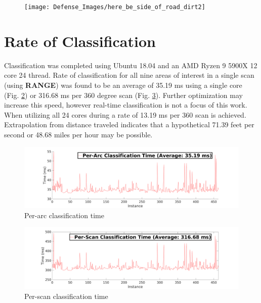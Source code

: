 \documentclass[numbered,pdftex]{ohio-etd}
\begin{document}
{{{		\begin{figure}[H]
			\centering
			\texttt{[image: Defense\_Images/here\_be\_side\_of\_road\_dirt2]}
			\caption[Blackburn Road Side of Road]{}
			\label{fig:here_be_side_of_road_dirt2}
		\end{figure}
		
	}



	\section{Rate of Classification}{
		
		{Classification was completed using Ubuntu 18.04 and an AMD Ryzen 9 5900X 12 core 24 thread. Rate of classification for all nine areas of interest in a single scan (using \textbf{RANGE}) was found to be an average of 35.19 ms using a single core (Fig. \ref{fig:per_arc_classification_time}) or 316.68 ms per 360 degree scan (Fig. \ref{fig:per_scan_classification_rate}). Further optimization may increase this speed, however real-time classification is not a focus of this work. When utilizing all 24 cores during a rate of 13.19 ms per 360 scan is achieved. Extrapolation from distance traveled indicates that a hypothetical 71.39 feet per second or 48.68 miles per hour may be possible.}
		
		\begin{figure}[H]
			\centering
			\includegraphics[width=0.9\linewidth]{Defense_Images/per_arc_classification_time}
			\caption[Per-Arc Time]{Per-arc classification time}
			\label{fig:per_arc_classification_time}
		\end{figure}
		
		\begin{figure}[H]
			\centering
			\includegraphics[width=0.9\linewidth]{Defense_Images/per_scan_classification_rate}
			\caption[Per-Scan Time]{Per-scan classification time}
			\label{fig:per_scan_classification_rate}
		\end{figure}
		
}}}
\end{document}
